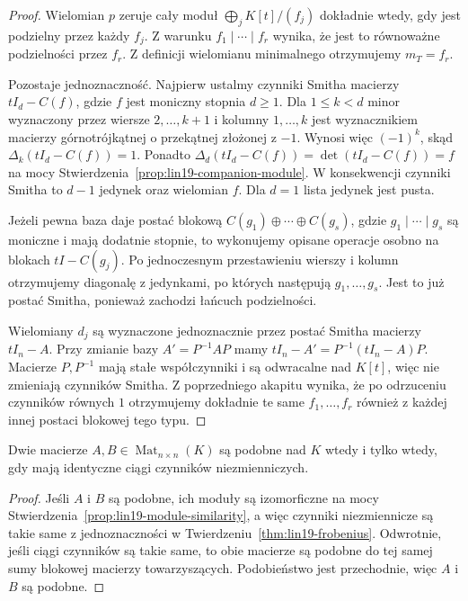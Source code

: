 \begin{proof}
Wielomian \(p\) zeruje cały moduł
\(\bigoplus_jK[t]/(f_j)\)
dokładnie wtedy, gdy jest
podzielny przez każdy \(f_j\).
Z warunku \(f_1\mid\cdots\mid f_r\)
wynika, że jest to równoważne
podzielności przez \(f_r\).
Z definicji wielomianu minimalnego
otrzymujemy \(m_T=f_r\).

Pozostaje jednoznaczność.
Najpierw ustalmy czynniki Smitha
macierzy \(tI_d-C(f)\), gdzie
\(f\) jest moniczny stopnia \(d\ge1\).
Dla \(1\le k<d\) minor wyznaczony
przez wiersze \(2,\ldots,k+1\)
i kolumny \(1,\ldots,k\)
jest wyznacznikiem macierzy górnotrójkątnej
o przekątnej złożonej z \(-1\).
Wynosi więc \((-1)^k\), skąd
\(\Delta_k(tI_d-C(f))=1\).
Ponadto
\(\Delta_d(tI_d-C(f))
=\det(tI_d-C(f))=f\)
na mocy
Stwierdzenia~\ref{prop:lin19-companion-module}.
W konsekwencji czynniki Smitha to
\(d-1\) jedynek oraz wielomian \(f\).
Dla \(d=1\) lista jedynek jest pusta.

Jeżeli pewna baza daje postać blokową
\(C(g_1)\oplus\cdots\oplus C(g_s)\),
gdzie \(g_1\mid\cdots\mid g_s\)
są moniczne i mają dodatnie stopnie,
to wykonujemy opisane operacje
osobno na blokach \(tI-C(g_j)\).
Po jednoczesnym przestawieniu
wierszy i kolumn otrzymujemy diagonalę
z jedynkami, po których następują
\(g_1,\ldots,g_s\).
Jest to już postać Smitha,
ponieważ zachodzi łańcuch podzielności.

Wielomiany \(d_j\) są wyznaczone
jednoznacznie przez postać Smitha
macierzy \(tI_n-A\).
Przy zmianie bazy \(A'=P^{-1}AP\)
mamy
\(tI_n-A'=P^{-1}(tI_n-A)P\).
Macierze \(P,P^{-1}\) mają stałe
współczynniki i są odwracalne nad \(K[t]\),
więc nie zmieniają czynników Smitha.
Z poprzedniego akapitu wynika,
że po odrzuceniu czynników równych \(1\)
otrzymujemy dokładnie te same
\(f_1,\ldots,f_r\) również z każdej
innej postaci blokowej tego typu.
\end{proof}

\begin{wniosek}
\label{cor:lin19-similarity}
Dwie macierze \(A,B\in\operatorname{Mat}_{n\times n}(K)\)
są podobne nad \(K\) wtedy i tylko wtedy,
gdy mają identyczne ciągi
czynników niezmienniczych.
\end{wniosek}
\begin{proof}
Jeśli \(A\) i \(B\) są podobne,
ich moduły są izomorficzne
na mocy
Stwierdzenia~\ref{prop:lin19-module-similarity},
a więc czynniki niezmiennicze
są takie same z jednoznaczności
w Twierdzeniu~\ref{thm:lin19-frobenius}.
Odwrotnie, jeśli ciągi czynników
są takie same, to obie macierze
są podobne do tej samej
sumy blokowej macierzy towarzyszących.
Podobieństwo jest przechodnie,
więc \(A\) i \(B\) są podobne.
\end{proof}

